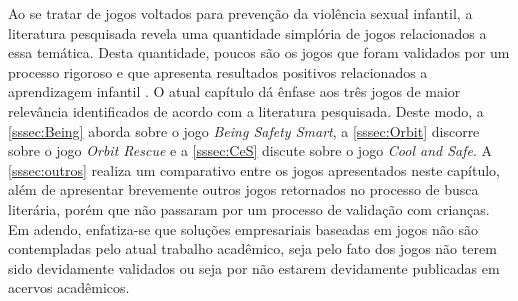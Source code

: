 Ao se tratar de jogos voltados para prevenção da violência sexual infantil, a literatura pesquisada revela uma quantidade simplória de jogos relacionados a essa temática. Desta quantidade, poucos são os jogos que foram validados por um processo rigoroso e que apresenta resultados positivos relacionados a aprendizagem infantil \cite{jones2010being}. O atual capítulo dá ênfase aos três jogos de maior relevância identificados de acordo com a literatura pesquisada. Deste modo, a \autoref{sssec:Being} aborda sobre o jogo \textit{Being Safety Smart}, a \autoref{sssec:Orbit} discorre sobre o jogo \textit{Orbit Rescue} e a \autoref{sssec:CeS} discute sobre o jogo \textit{Cool and Safe}. A \autoref{sssec:outros} realiza um comparativo entre os jogos apresentados neste capítulo, além de apresentar brevemente outros jogos retornados no processo de busca literária, porém que não passaram por um processo de validação com crianças. Em adendo, enfatiza-se que soluções empresariais baseadas em jogos não são contempladas pelo atual trabalho acadêmico, seja pelo fato dos jogos não terem sido devidamente validados ou seja por não estarem devidamente publicadas em acervos acadêmicos.

















